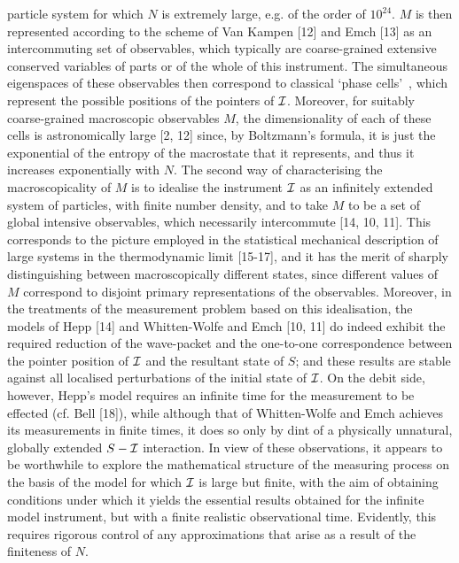 particle system for which $N$ is extremely large, e.g. of the order of $10^{24}$. $M$ is 
then represented according to the scheme of Van Kampen [12] and Emch [13] as an 
intercommuting set of observables, which typically are coarse-grained extensive 
conserved variables of  parts or of the whole of  this instrument. The simultaneous 
eigenspaces of these observables then correspond to classical \lq phase cells\rq\ , which 
represent the possible positions of the pointers of ${\cal I}$. Moreover, for suitably 
coarse-grained macroscopic observables $M$, the dimensionality of each of these cells is 
astronomically large [2, 12] since,  by Boltzmann\rq s formula, it is just the exponential 
of the entropy of the macrostate that it represents, and thus it increases exponentially with 
$N$.
\vskip 0.2cm
The second way of characterising the macroscopicality of $M$ is to idealise the 
instrument ${\cal I}$ as an infinitely extended system of particles, with finite number 
density, and to take $M$ to be a set of global intensive observables, which necessarily 
intercommute [14, 10, 11]. This corresponds to the picture employed in the statistical 
mechanical description of large systems in the thermodynamic limit [15-17], and it has 
the merit of sharply distinguishing between macroscopically different states, since 
different values of $M$ correspond to disjoint primary representations of the observables. 
Moreover, in the treatments of the measurement problem based on this idealisation, the 
models of Hepp [14] and Whitten-Wolfe and Emch [10, 11] do indeed exhibit the 
required reduction of the wave-packet and the one-to-one correspondence between the 
pointer position of ${\cal I}$  and the resultant state of $S$; and these results are stable 
against all localised perturbations of the initial state of ${\cal I}$. On the debit side, 
however, Hepp\rq s model requires an infinite time for the measurement to be effected 
(cf. Bell [18]), while although that of Whitten-Wolfe and Emch achieves its 
measurements in finite times, it does so only by dint of a physically unnatural, globally 
extended $S-{\cal I}$ interaction. In view of these observations, it appears to be 
worthwhile to explore the mathematical structure of the measuring process on the basis of 
the model for which ${\cal I}$ is large but finite, with the aim of obtaining conditions 
under which it yields the essential results obtained for the infinite model instrument, but 
with a finite realistic observational time. Evidently, this  requires rigorous control of any 
approximations that arise as a result of the finiteness of $N$.
